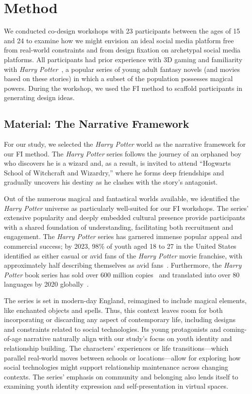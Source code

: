 \section{Method}

We conducted co-design workshops with 23 participants between the ages of 15 and 24 to examine how we might envision an ideal social media platform free from real-world constraints and from design fixation on archetypal social media platforms. All participants had prior experience with 3D gaming and familiarity with \textit{Harry Potter}~\cite{rowling2015harry, harrypotterfanclub}, a popular series of young adult fantasy novels (and movies based on these stories) in which a subset of the population possesses magical powers. During the workshop, we used the FI method to scaffold participants in generating design ideas.

\subsection{Material: The Narrative Framework}

For our study, we selected the \textit{Harry Potter} world as the narrative framework for our FI method. The \textit{Harry Potter} series follows the journey of an orphaned boy who discovers he is a wizard and, as a result, is invited to attend ``Hogwarts School of Witchcraft and Wizardry,'' where he forms deep friendships and gradually uncovers his destiny as he clashes with the story's antagonist.

Out of the numerous magical and fantastical worlds available, we identified the \textit{Harry Potter} universe as particularly well-suited for our FI workshops. The series' extensive popularity and deeply embedded cultural presence provide participants with a shared foundation of understanding, facilitating both recruitment and engagement. The \textit{Harry Potter} series has garnered immense popular appeal and commercial success; by 2023, 98\% of youth aged 18 to 27 in the United States identified as either casual or avid fans of the \textit{Harry Potter} movie franchise, with approximately half describing themselves as avid fans~\cite{harrypotterfan}. Furthermore, the \textit{Harry Potter} book series has sold over 600 million copies~\cite{harrypotterscholastic} and translated into over 80 languages by 2020 globally~\cite{TheRowlingLibrary-2020-BigTranslationsPotter-z}.

The series is set in modern-day England, reimagined to include magical elements, like enchanted objects and spells. Thus, this context leaves room for both incorporating or discarding any aspect of contemporary life, including designs and constraints related to social technologies. Its young protagonists and coming-of-age narrative naturally align with our study's focus on youth identity and relationship building. The characters' experiences or life transitions---which parallel real-world moves between schools or locations---allow for exploring how social technologies might support relationship maintenance across changing contexts. The series' emphasis on community and belonging also lends itself to examining youth identity expression and self-presentation in virtual spaces.

